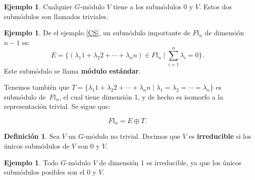 \documentclass[12pt]{book}
\theoremstyle{definition}
\newtheorem{definition}[theorem]{Definición}
\newtheorem{example}[theorem]{Ejemplo}
\newcounter{in}
\newcounter{ini}
\begin{document}
\begin{example}
  Cualquier $G$-módulo $V$ tiene a los submódulos 0 y $V$. Estos dos
  submódulos son llamados triviales.
\end{example}

\begin{example}
  \label{sub-estandar}
  De el ejemplo \ref{CS}, un submódulo importante de
  $F\mathbb{I}_{n}$ de dimensión $n-1$ es:
  \begin{equation*}
    E=\Big\{(\lambda_{1}1+\lambda_{2}2+\cdots+\lambda_{n}n)\in F\mathbb{I}_{n}\mid\sum^{n}_{i=1}\lambda_{i}=0\Big\}.
  \end{equation*}
  Este submódulo se llama \textbf{módulo estándar}. 
  
  Tenemos también que $T=\{\lambda_{1}1+\lambda_{2}2+\cdots+\lambda_{n}n\mid
  \lambda_{1}=\lambda_{2}=\cdots=\lambda_{n}\}$ es submódulo
  de~$F\mathbb{I}_{n}$, el cual tiene dimensión 1, y de hecho
  es isomorfo a la representación trivial. Se sigue que:

  \begin{equation*}
    F\mathbb{I}_{n}=E\oplus T.
  \end{equation*}  
\end{example}

\begin{definition}
  Sea $V$ un $G$-módulo no trivial. Decimos que $V$ es \textbf{irreducible} si
  los únicos submódulos de $V$ son $0$ y $V$.
\end{definition}

\begin{example}
  Todo $G$-módulo $V$ de dimensión 1 es irreducible, ya que los únicos
  submódulos posibles son el 0 y $V$.
\end{example}
\end{document}

